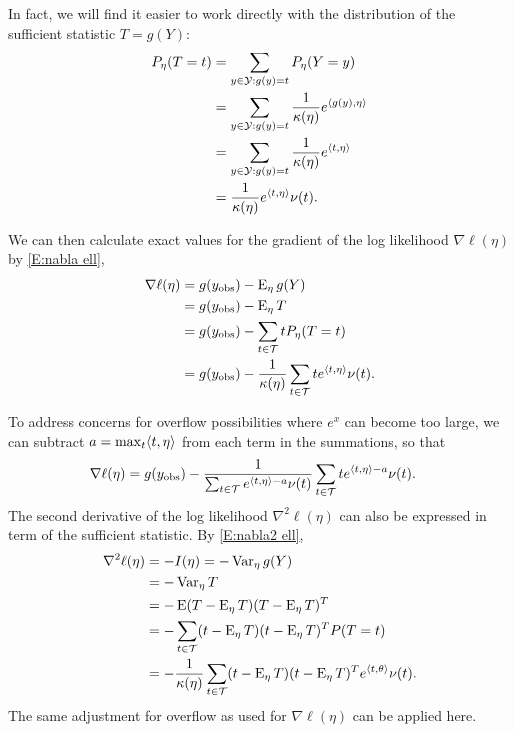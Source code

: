 In fact, we will find it easier to work directly with the distribution of the sufficient
statistic $T=g(Y)$:
\begin{align*}
	P_\eta(T=t) 	&= \sum_{y \in {\mathcal Y}: g(y) = t} P_\eta(Y= y ) \\
		 		&= \sum_{y \in {\mathcal Y}: g(y) = t} \frac{1}{\kappa(\eta)} e^{\langle g(y),\eta \rangle } \\
				&= \sum_{y \in {\mathcal Y}: g(y) = t} \frac{1}{\kappa(\eta)} e^{\langle t,\eta \rangle } \\
				&= \frac{1}{\kappa(\eta)} e^{\langle t,\eta \rangle } \nu(t).
\end{align*}

We can then calculate exact values for the gradient of the log likelihood $\nabla \ell(\eta)$ by \eqref{E:nabla ell},
\begin{align*}
	\nabla \ell (\eta) &= g(y_{\text{obs}}) - \operatorname{E}_\eta g(Y)\\ 
					  &= g(y_{\text{obs}}) - \operatorname{E}_\eta T \\
					  &= g(y_{\text{obs}}) - \sum_{t \in {\mathcal T}} t P_\eta(T = t) \\
					  &= g(y_{\text{obs}}) - \frac{1}{\kappa(\eta)}  \sum_{t \in {\mathcal T}} t e^{\langle t,\eta \rangle } \nu(t).
\end{align*}

To address concerns for overflow possibilities where $e^x$ can become too large, we 
can subtract $a = \max_t \langle t, \eta \rangle$ from each term in the summations, so that
\begin{align*}
	\nabla \ell (\eta) &= g(y_{\text{obs}}) - \frac{1}{\sum_{t \in {\mathcal T}} e^{\langle t,\eta \rangle-a} \nu(t)}  \sum_{t \in {\mathcal T}} t e^{\langle t,\eta \rangle-a} \nu(t).
\end{align*}
The second derivative of the log likelihood $\nabla ^2 \ell(\eta)$ can also be 
expressed in term of the sufficient statistic.  By \eqref{E:nabla2 ell},
\begin{align*}
	\nabla ^2 \ell(\eta) &= - I(\eta) = -\operatorname{Var}_\eta g(Y) \\
	&= -\operatorname{Var}_\eta T \\ 
	&= - \operatorname{E} (T - \operatorname{E}_\eta T)( T - \operatorname{E}_\eta T)^T \\
				&= - \sum_{t \in {\mathcal T}} (t - \operatorname{E}_\eta T)(t - \operatorname{E}_\eta T)^T P(T=t)\\
				&= - \frac{1}{\kappa(\eta)} \sum_{t\in {\mathcal T}}
					(t - \operatorname{E}_\eta T)(t - \operatorname{E}_\eta T)^T e^{\langle t,\theta \rangle} \nu(t).
\end{align*}
The same adjustment for overflow as used for $\nabla \ell(\eta)$ can be applied here.

